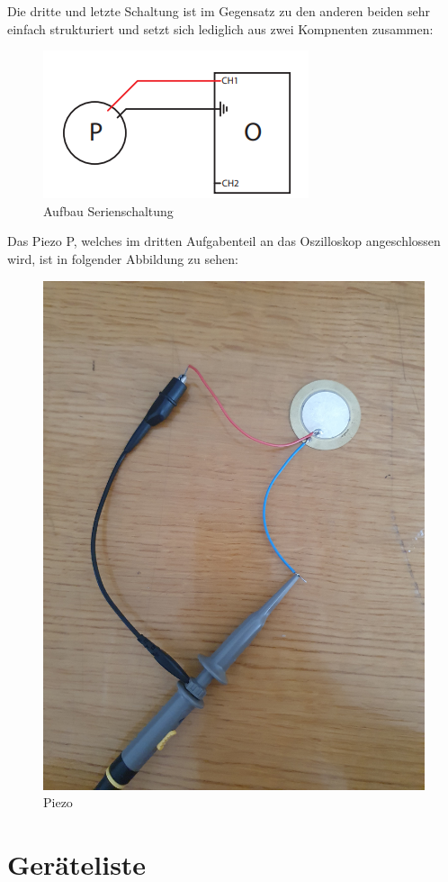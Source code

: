 \documentclass[12pt,a4paper,twoside]{article}
\begin{document}
\noindent
Die dritte und letzte Schaltung ist im Gegensatz zu den anderen beiden sehr einfach strukturiert und setzt sich lediglich aus zwei Kompnenten zusammen:

\begin{figure}[H]
    \centering
    \includegraphics[width=0.6\linewidth, angle=0]{nudes/3.4 Eigenfrequenz.png}
    \caption{Aufbau Serienschaltung}
    \label{fig:Schaltplan Eigenfrequenzbestimmung}
\end{figure}

\noindent
Das Piezo P, welches im dritten Aufgabenteil an das Oszilloskop angeschlossen wird, ist in folgender Abbildung zu sehen:

\begin{figure}[H]
    \centering
    \includegraphics[width=0.6\linewidth, angle=0]{nudes/Piezo.jpg}
    \caption{Piezo}
    \label{fig:Piezo}
\end{figure}



\section{Geräteliste} %
\end{document}

